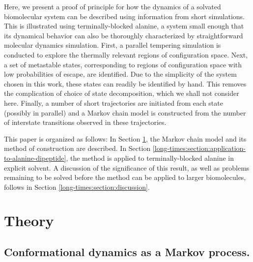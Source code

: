Here, we present a proof of principle for how the dynamics of a solvated biomolecular system can be described using information from short simulations.
This is illustrated using terminally-blocked alanine, a system small enough that its dynamical behavior can also be thoroughly characterized by straightforward molecular dynamics simulation.  
First, a parallel tempering simulation is conducted to explore the thermally relevant regions of configuration space.
Next, a set of metastable states, corresponding to regions of configuration space with low probabilities of escape, are identified.
Due to the simplicity of the system chosen in this work, these states can readily be identified by hand.
This removes the complication of choice of state decomposition, which we shall not consider here.  
Finally, a number of short trajectories are initiated from each state (possibly in parallel) and a Markov chain model is constructed from the number of interstate transitions observed in these trajectories.

This paper is organized as follows: 
In Section \ref{long-times:section:theory}, the  Markov chain model and its method of construction are described.  
In Section \ref{long-times:section:application-to-alanine-dipeptide}, the method is applied to terminally-blocked alanine in explicit solvent.
A discussion of the significance of this result, as well as problems remaining to be solved before the method can be applied to larger biomolecules, follows in Section \ref{long-times:section:discussion}.

\section{Theory}
\label{long-times:section:theory}

\subsection{Conformational dynamics as a Markov process.}
\label{long-times:section:conformational-dynamics-as-markov-process}

